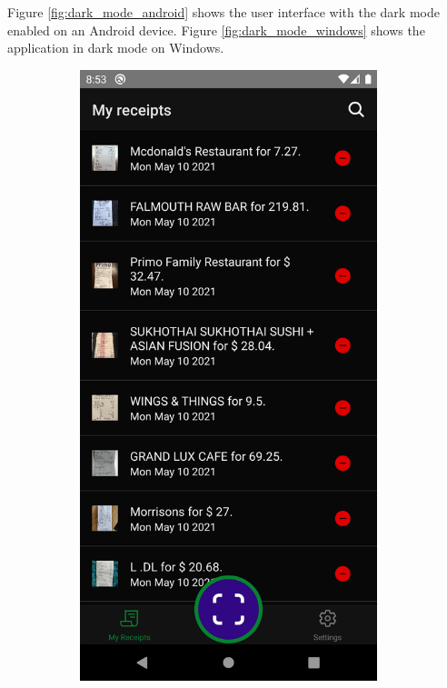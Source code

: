 \documentclass[
  digital, %
  table,   %
  oneside, %
  lof,     %
  lot,     %
]{fithesis3}
\newcommand\half{0.45}
\newcommand\subfigsize{0.95}
\begin{document}
Figure \ref{fig:dark_mode_android} shows the user interface with the dark mode enabled on an Android device. Figure \ref{fig:dark_mode_windows} shows the application in dark mode on Windows.

\begin{figure}
    \centering
    \begin{subfigure}[t]{\half\textwidth}
      \centering
      \includegraphics[width=\subfigsize\textwidth]{figures/screens/android/dark/receipts_list}

\end{subfigure}
\end{figure}
\end{document}
